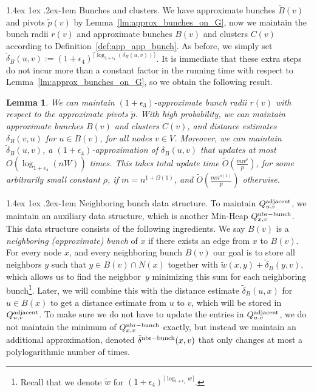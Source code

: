 \documentclass[11pt]{article}
\makeatletter
\newtheorem{lemma}[theorem]{Lemma}
\theoremstyle{definition}
\theoremstyle{remark}
\renewcommand{\paragraph}{%
  \@startsection{paragraph}{4}%
  {\z@}{1.4ex \@plus 1ex \@minus .2ex}{-1em}%
  {\normalfont\normalsize\bfseries}%
}
\makeatother
\begin{document}
\paragraph{Bunches and clusters.}
We have approximate bunches $\tilde B(v)$ and pivots $\tilde p(v)$ by Lemma~\ref{lm:approx_bunches_on_G}, now we maintain the bunch radii $r(v)$ and approximate bunches $B(v)$ and clusters $C(v)$ according to Definition~\ref{def:app_app_bunch}. 
As before, we simply set $\tilde \delta_B(u,v):= (1+\epsilon_4)^{\lceil\log_{1+\epsilon_4}(\delta_B(u,v))\rceil}$. It is immediate that these extra steps do not incur more than a constant factor in the running time with respect to Lemma~\ref{lm:approx_bunches_on_G}, so we obtain the following result. 

\begin{lemma}\label{lm:updatebunches}
    We can maintain $(1+\epsilon_3)$-approximate bunch radii $r(v)$ with respect to the approximate pivots $\tilde p$.
    With high probability, we can maintain approximate bunches $B(v)$ and clusters $C(v)$, and distance estimates $\delta_B(v,u)$ for $u\in B(v)$, for all nodes $v\in V$. Moreover, we can maintain $\tilde \delta_B(u,v)$, a $(1+\epsilon_4)$-approximation of $\delta_B(u,v)$ that updates at most $O(\log_{1+\epsilon_4}(nW))$ times. This takes total update time $ \tilde O (\tfrac{mn^\rho}{p}) $, for some arbitrarily small constant $\rho$, if $m=n^{1+\Omega(1)}$, and $\tilde O(\tfrac{mn^{o(1)}}{p})$ otherwise. 
\end{lemma}






\paragraph{Neighboring bunch data structure.} 
To maintain $Q^{\rm{adjacent}}_{u,v}$, we maintain an auxiliary data structure, which is another Min-Heap $Q^{\rm{nbr-bunch}}_{x,v}$. This data structure consists of the following ingredients. We say $B(v)$ is a \emph{neighboring (approximate) bunch} of $x$ if there exists an edge from $x$ to $B(v)$. For every node $ x $, and every neighboring bunch $ B (v) $ our goal is to store  all neighbors $ y $ such that $ y \in B (v) \cap N(x) $ together with $ \tilde w (x, y) + \tilde\delta_B(y, v) $, which allows us to find the neighbor~$ y $ minimizing this sum for each neighboring bunch\footnote{Recall that we denote $\tilde w$ for $(1+\epsilon_4)^{\lceil\log_{1+\epsilon_4}{w}\rceil}$.}. Later, we will combine this with the distance estimate $\tilde\delta_B(u,x)$ for $u\in B(x)$ to get a distance estimate from $u$ to $v$, which will be stored in $Q^{\rm{adjacent}}_{u,v}$. To make sure we do not have to update the entries in $Q^{\rm{adjacent}}_{u,v}$, we do not maintain the minimum of $Q^{\rm{nbr-bunch}}_{x,v}$ exactly, but instead we maintain an additional approximation, denoted $\tilde\delta^{\rm{nbr-bunch}}(x,v)$ that only changes at most a polylogarithmic number of times.
\end{document}
